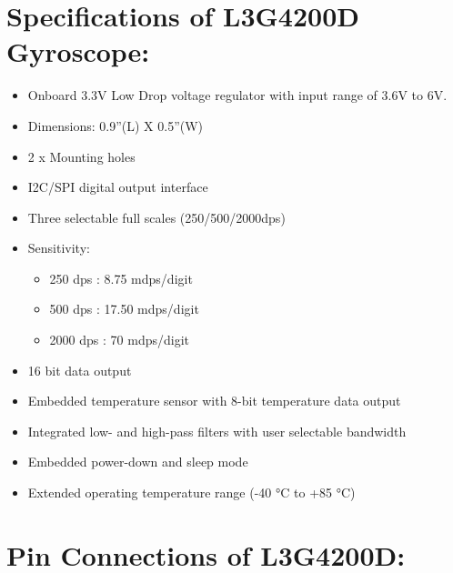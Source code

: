 \documentclass[a4paper,12 pt]{article}
\begin{document}
\section{Specifications of L3G4200D Gyroscope: }
\begin{itemize}
\item Onboard 3.3V Low Drop voltage regulator with input range of 3.6V to 6V.
\item Dimensions: 0.9”(L) X 0.5”(W)
\item 2 x Mounting holes
\item I2C/SPI digital output interface
\item Three selectable full scales (250/500/2000dps)
\item Sensitivity: 
\begin{itemize}
\item 250 dps : 8.75 mdps/digit 
\item 500 dps : 17.50 mdps/digit
\item 2000 dps : 70 mdps/digit
\end{itemize}

\item 16 bit data output
\item Embedded temperature sensor with 8-bit temperature data output
\item Integrated low- and high-pass filters with user selectable bandwidth
\item Embedded power-down and sleep mode
\item Extended operating temperature range (-40 °C to +85 °C)
\end{itemize}
\pagebreak

\section{Pin Connections of L3G4200D:}
\end{document}
